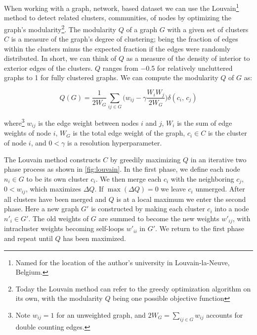 When working with a graph, \ie network, based dataset
we can use the Louvain\footnote{Named for the location of the author's university in Louvain-la-Neuve, Belgium.} method \cite{louvain}
to detect related clusters, \ie communities,
of nodes by optimizing the graph's modularity\footnote{Today the Louvain method can refer to the greedy optimization algorithm on its own,
with the modularity $Q$ being one possible objective function}.
The modularity $Q$ of a graph $G$ with a given set of clusters $C$
is a measure of the graph's degree of clustering;
being the fraction of edges within the clusters
minus the expected fraction if the edges were randomly distributed.
In short, we can think of $Q$ as a measure of
the density of interior to exterior edges of the clusters.
$Q$ ranges from \num{-0.5} for relatively uncluttered graphs
to \num{1} for fully clustered graphs.
We can compute the modularity $Q$ of $G$ as:

\begin{equation} \label{eq:unsupervised:louvain:modularity}
Q\left(G\right) = \frac{1}{2 W_{G}} \sum_{ij \in G} \bigg(w_{ij} - \gamma \frac{W_{i} W_{j}}{2 W_{G}}\bigg) \delta\left(c_{i},\,c_{j}\right)
\end{equation}

\noindent where\footnote{Note $w_{ij}=1$ for an unweighted graph, and $2 W_{G} = \sum_{ij \in G} w_{ij}$ accounts for double counting edges.}
$w_{ij}$ is the edge weight between nodes $i$ and $j$,
$W_{i}$ is the sum of edge weights of node $i$,
$W_{G}$ is the total edge weight of the graph,
$c_{i} \in C$ is the cluster of node $i$,
and $0 < \gamma$ is a resolution hyperparameter.

The Louvain method constructs $C$ by greedily maximizing $Q$ in an iterative two phase process as shown in \cref{fig:louvain}.
In the first phase, we define each node $n_{i} \in G$ to be its own cluster $c_{i}$.
We then merge each $c_{i}$ with the neighboring $c_{j}$, $0 < w_{ij}$, which maximizes $\Delta Q$.
If $\max\left(\Delta Q\right) = 0$ we leave $c_{i}$ unmerged.
After all clusters have been merged and $Q$ is at a local maximum we enter the second phase.
Here a new graph $G'$ is constructed by making each cluster $c_{i}$ into a node $n'_{i} \in G'$.
The old weights of $G$ are summed to become the new weights $w'_{ij}$,
with intracluster weights becoming self-loops $w'_{ii}$ in $G'$.
We return to the first phase and repeat until $Q$ has been maximized.

